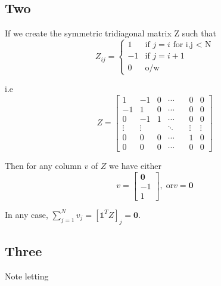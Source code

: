 \documentclass[paper=a4, fontsize=12pt]{scrartcl} %
\numberwithin{equation}{section}       %
\numberwithin{figure}{section}         %
\numberwithin{table}{section}          %
\begin{document}
\subsection{Two}
If we create the symmetric tridiagonal matrix Z such that 
$$
Z_{ij} = 
\begin{cases}
	1 &\text{if $j=i$ for i,j < N}\\
	-1& \text{if $j = i + 1$}\\
	0 & \text{o/w}
\end{cases}
$$

\noindent i.e 
$$
Z = 
\begin{bmatrix}
     1 & -1 & 0  &\cdots & \, & 0 & 0 \\
     -1 & 1  & 0 &\cdots & \, & 0& 0 \\
     0 & -1 & 1 & \cdots & \, & 0& 0 \\
	\vdots & \vdots & \, & \ddots & \,  & \vdots & \vdots \\
	0 & 0 & 0 &   \cdots& &  1 & 0 \\
	0 & 0 & 0  & \cdots & \, & 0 & 0
\end{bmatrix}
$$

\noindent Then for any column $v$ of $Z$ we have either 
$$ v = 
\begin{bmatrix}
\boldsymbol{0} \\
-1 \\
1 
\end{bmatrix}, \; 
\text{or}
v = \boldsymbol{0}
$$

\noindent In any case, $\sum_{j=1}^{N} v_{j} = [ \mathbb{1}^T Z ]_j = \boldsymbol{0}$.

\subsection{Three} 
Note letting
\end{document}
